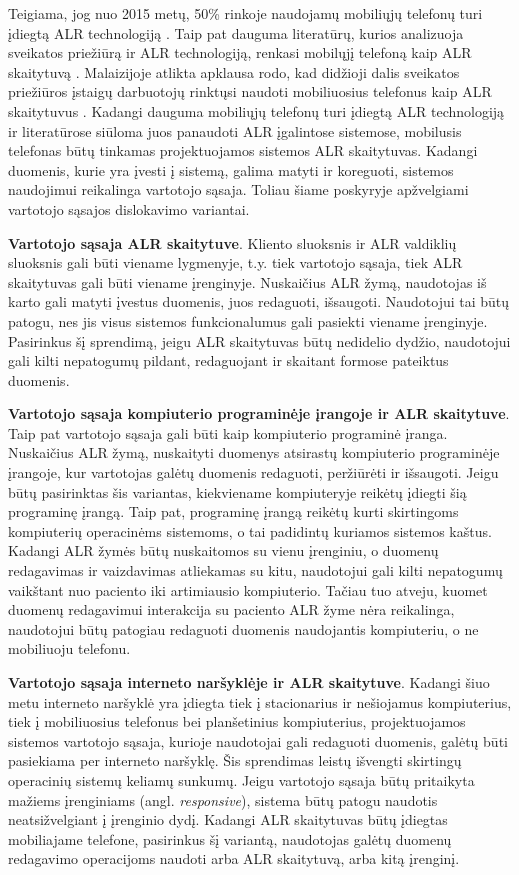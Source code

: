 Teigiama, jog nuo 2015 metų, 50\% rinkoje naudojamų mobiliųjų telefonų turi įdiegtą ALR technologiją \cite{forum2}. Taip pat dauguma literatūrų, kurios analizuoja sveikatos priežiūrą ir ALR technologiją, renkasi mobilųjį telefoną kaip ALR skaitytuvą \cite{Azlina2013} \cite{Strommer2006} \cite{Puma2012} \cite{Marcus} \cite{Gautam}. Malaizijoje atlikta apklausa rodo, kad didžioji dalis sveikatos priežiūros įstaigų darbuotojų rinktųsi naudoti mobiliuosius telefonus kaip ALR skaitytuvus \cite{Azlina2013}. Kadangi dauguma mobiliųjų telefonų turi įdiegtą ALR technologiją ir literatūrose siūloma juos panaudoti ALR įgalintose sistemose, mobilusis telefonas būtų tinkamas projektuojamos sistemos ALR skaitytuvas. Kadangi duomenis, kurie yra įvesti į sistemą, galima matyti ir koreguoti, sistemos naudojimui reikalinga vartotojo sąsaja. Toliau šiame poskyryje apžvelgiami vartotojo sąsajos dislokavimo variantai.

\textbf{Vartotojo sąsaja ALR skaitytuve}. Kliento sluoksnis ir ALR valdiklių sluoksnis gali būti viename lygmenyje, t.y. tiek vartotojo sąsaja, tiek ALR skaitytuvas gali būti viename įrenginyje. Nuskaičius ALR žymą, naudotojas iš karto gali matyti įvestus duomenis, juos redaguoti, išsaugoti. Naudotojui tai būtų patogu, nes jis visus sistemos funkcionalumus gali pasiekti viename įrenginyje. Pasirinkus šį sprendimą, jeigu ALR skaitytuvas būtų nedidelio dydžio, naudotojui gali kilti nepatogumų pildant, redaguojant ir skaitant formose pateiktus duomenis.

\textbf{Vartotojo sąsaja kompiuterio programinėje įrangoje ir ALR skaitytuve}. Taip pat vartotojo sąsaja gali būti kaip kompiuterio programinė įranga. Nuskaičius ALR žymą, nuskaityti duomenys atsirastų kompiuterio programinėje įrangoje, kur vartotojas galėtų duomenis redaguoti, peržiūrėti ir išsaugoti. Jeigu būtų pasirinktas šis variantas, kiekviename kompiuteryje reikėtų įdiegti šią programinę įrangą. Taip pat, programinę įrangą reikėtų kurti skirtingoms kompiuterių operacinėms sistemoms, o tai padidintų kuriamos sistemos kaštus. Kadangi ALR žymės būtų nuskaitomos su vienu įrenginiu, o duomenų redagavimas ir vaizdavimas atliekamas su kitu, naudotojui gali kilti nepatogumų vaikštant nuo paciento iki artimiausio kompiuterio. Tačiau tuo atveju, kuomet duomenų redagavimui interakcija su paciento ALR žyme nėra reikalinga, naudotojui būtų patogiau redaguoti duomenis naudojantis kompiuteriu, o ne mobiliuoju telefonu. 

\textbf{Vartotojo sąsaja interneto naršyklėje ir ALR skaitytuve}. Kadangi šiuo metu interneto naršyklė yra įdiegta tiek į stacionarius ir nešiojamus kompiuterius, tiek į mobiliuosius telefonus bei planšetinius kompiuterius, projektuojamos sistemos vartotojo sąsaja, kurioje naudotojai gali redaguoti duomenis, galėtų būti pasiekiama per interneto naršyklę. Šis sprendimas leistų išvengti skirtingų operacinių sistemų keliamų sunkumų. Jeigu vartotojo sąsaja būtų pritaikyta mažiems įrenginiams (angl. \textit{responsive}), sistema būtų patogu naudotis neatsižvelgiant į įrenginio dydį. Kadangi ALR skaitytuvas būtų įdiegtas mobiliajame telefone, pasirinkus šį variantą, naudotojas galėtų duomenų redagavimo operacijoms naudoti arba ALR skaitytuvą, arba kitą įrenginį. 


